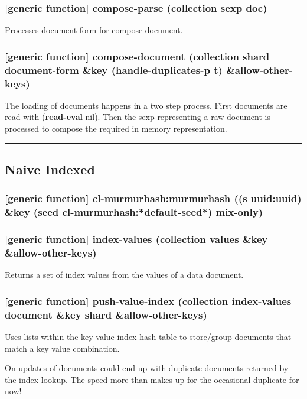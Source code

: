 \documentclass[11pt]{article}
\begin{document}
\subsubsection{[generic function] compose-parse (collection sexp doc)}
\label{sec:org1de03f6}

Processes document form for compose-document.

\subsubsection{[generic function] compose-document (collection shard document-form \&key (handle-duplicates-p t)  \&allow-other-keys)}
\label{sec:org00ac567}

The loading of documents happens in a two step process. First
documents are read with (\textbf{read-eval} nil). Then the sexp representing
a raw document is processed to compose the required in memory
representation.

\noindent\rule{\textwidth}{0.5pt}


\subsection{Naive Indexed}
\label{sec:org194d953}

\subsubsection{[generic function] cl-murmurhash:murmurhash ((s uuid:uuid) \&key (seed cl-murmurhash:*default-seed*) mix-only)}
\label{sec:org11ba152}

\subsubsection{[generic function] index-values (collection values \&key \&allow-other-keys)}
\label{sec:orgf6f847c}

Returns a set of index values from the values of a data document.

\subsubsection{[generic function] push-value-index (collection index-values document \&key shard \&allow-other-keys)}
\label{sec:orgba07df2}

Uses lists within the key-value-index hash-table to store/group
documents that match a key value combination.

On updates of documents could end up with duplicate documents returned
by the index lookup. The speed more than makes up for the occasional
duplicate for now!
\end{document}
